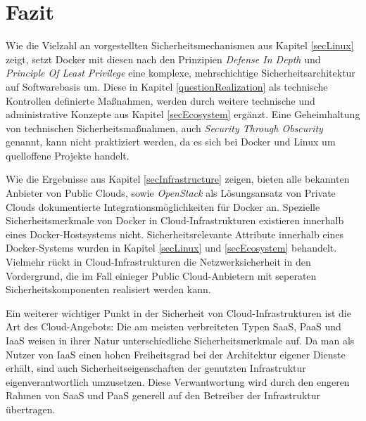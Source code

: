 \documentclass[../main.tex]{subfiles}
\begin{document}
\chapter{Fazit}
\label{result}

  Wie die Vielzahl an vorgestellten Sicherheitsmechanismen aus Kapitel \ref{secLinux} zeigt, setzt Docker mit diesen nach den Prinzipien \emph{Defense In Depth} und \emph{Principle Of Least Privilege} eine komplexe, mehrschichtige Sicherheitsarchitektur auf Softwarebasis um. Diese in Kapitel \ref{questionRealization} als technische Kontrollen definierte Maßnahmen, werden durch weitere technische und administrative Konzepte aus Kapitel \ref{secEcosystem} ergänzt. Eine Geheimhaltung von technischen Sicherheitsmaßnahmen, auch \emph{Security Through Obscurity} genannt, kann nicht praktiziert werden, da es sich bei Docker und Linux um quelloffene Projekte handelt.

  Wie die Ergebnisse aus Kapitel \ref{secInfrastructure} zeigen, bieten alle bekannten Anbieter von Public Clouds, sowie \emph{OpenStack} als Lösungsansatz von Private Clouds dokumentierte Integrationsmöglichkeiten für Docker an. Spezielle Sicherheitsmerkmale von Docker in Cloud-Infrastrukturen existieren innerhalb eines Docker-Hostsystems nicht. Sicherheitsrelevante Attribute innerhalb eines Docker-Systems wurden in Kapitel \ref{secLinux} und \ref{secEcosystem} behandelt. Vielmehr rückt in Cloud-Infrastrukturen die Netzwerksicherheit in den Vordergrund, die im Fall einieger Public Cloud-Anbietern mit seperaten Sicherheitskomponenten realisiert werden kann.

  Ein weiterer wichtiger Punkt in der Sicherheit von Cloud-Infrastrukturen ist die Art des Cloud-Angebots: Die am meisten verbreiteten Typen SaaS, PaaS und IaaS weisen in ihrer Natur unterschiedliche Sicherheitsmerkmale auf. Da man als Nutzer von IaaS einen hohen Freiheitsgrad bei der Architektur eigener Dienste erhält, sind auch Sicherheitseigenschaften der genutzten Infrastruktur eigenverantwortlich umzusetzen. Diese Verwantwortung wird durch den engeren Rahmen von SaaS und PaaS generell auf den Betreiber der Infrastruktur übertragen.
\end{document}
